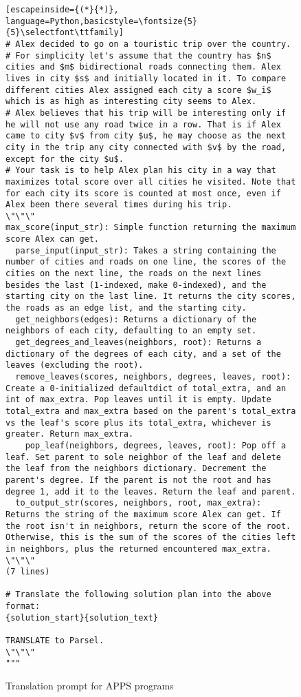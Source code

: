 \begin{figure*}[h]
\begin{lstlisting}[escapeinside={(*}{*)}, language=Python,basicstyle=\fontsize{5}{5}\selectfont\ttfamily]
# Alex decided to go on a touristic trip over the country.
# For simplicity let's assume that the country has $n$ cities and $m$ bidirectional roads connecting them. Alex lives in city $s$ and initially located in it. To compare different cities Alex assigned each city a score $w_i$ which is as high as interesting city seems to Alex.
# Alex believes that his trip will be interesting only if he will not use any road twice in a row. That is if Alex came to city $v$ from city $u$, he may choose as the next city in the trip any city connected with $v$ by the road, except for the city $u$.
# Your task is to help Alex plan his city in a way that maximizes total score over all cities he visited. Note that for each city its score is counted at most once, even if Alex been there several times during his trip.
\"\"\"
max_score(input_str): Simple function returning the maximum score Alex can get.
  parse_input(input_str): Takes a string containing the number of cities and roads on one line, the scores of the cities on the next line, the roads on the next lines besides the last (1-indexed, make 0-indexed), and the starting city on the last line. It returns the city scores, the roads as an edge list, and the starting city.
  get_neighbors(edges): Returns a dictionary of the neighbors of each city, defaulting to an empty set.
  get_degrees_and_leaves(neighbors, root): Returns a dictionary of the degrees of each city, and a set of the leaves (excluding the root).
  remove_leaves(scores, neighbors, degrees, leaves, root): Create a 0-initialized defaultdict of total_extra, and an int of max_extra. Pop leaves until it is empty. Update total_extra and max_extra based on the parent's total_extra vs the leaf's score plus its total_extra, whichever is greater. Return max_extra.
    pop_leaf(neighbors, degrees, leaves, root): Pop off a leaf. Set parent to sole neighbor of the leaf and delete the leaf from the neighbors dictionary. Decrement the parent's degree. If the parent is not the root and has degree 1, add it to the leaves. Return the leaf and parent.
  to_output_str(scores, neighbors, root, max_extra): Returns the string of the maximum score Alex can get. If the root isn't in neighbors, return the score of the root. Otherwise, this is the sum of the scores of the cities left in neighbors, plus the returned encountered max_extra.
\"\"\"
(7 lines)

# Translate the following solution plan into the above format:
{solution_start}{solution_text}

TRANSLATE to Parsel.
\"\"\"
"""
\end{lstlisting} 
\caption{Translation prompt for APPS programs}
\end{figure*}

